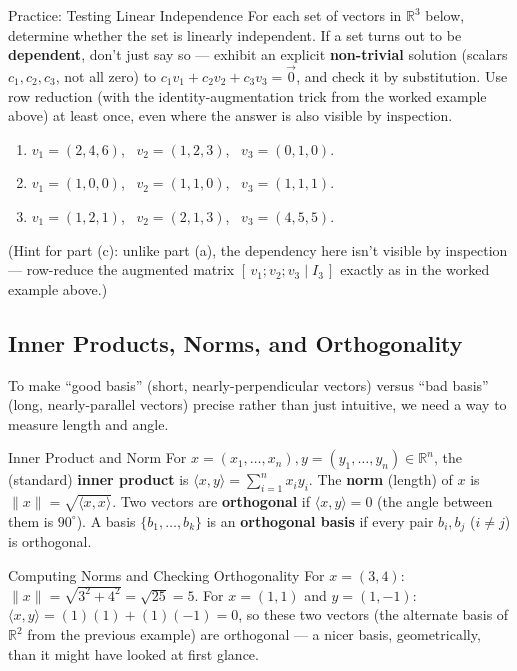 \begin{exercisebox}{Practice: Testing Linear Independence}
For each set of vectors in $\mathbb{R}^3$ below, determine whether the set is linearly independent. If a set turns out to be \textbf{dependent}, don't just say so --- exhibit an explicit \textbf{non-trivial} solution (scalars $c_1,c_2,c_3$, not all zero) to $c_1v_1+c_2v_2+c_3v_3=\vec 0$, and check it by substitution. Use row reduction (with the identity-augmentation trick from the worked example above) at least once, even where the answer is also visible by inspection.
\begin{enumerate}[leftmargin=*, label=(\alph*)]
  \item $v_1=(2,4,6)$, \ $v_2=(1,2,3)$, \ $v_3=(0,1,0)$.
  \item $v_1=(1,0,0)$, \ $v_2=(1,1,0)$, \ $v_3=(1,1,1)$.
  \item $v_1=(1,2,1)$, \ $v_2=(2,1,3)$, \ $v_3=(4,5,5)$.
\end{enumerate}
(Hint for part (c): unlike part (a), the dependency here isn't visible by inspection --- row-reduce the augmented matrix $[\,v_1;v_2;v_3\mid I_3\,]$ exactly as in the worked example above.)
\end{exercisebox}

\subsection{Inner Products, Norms, and Orthogonality}
\label{sec:L1:inner-products-norms-and-orthogonality}

To make ``good basis'' (short, nearly-perpendicular vectors) versus ``bad basis'' (long, nearly-parallel vectors) precise rather than just intuitive, we need a way to measure length and angle.

\begin{defbox}{Inner Product and Norm}
For $x = (x_1,\ldots,x_n), y=(y_1,\ldots,y_n) \in \mathbb{R}^n$, the (standard) \textbf{inner product} is $\langle x, y \rangle = \sum_{i=1}^n x_i y_i$. The \textbf{norm} (length) of $x$ is $\|x\| = \sqrt{\langle x,x \rangle}$. Two vectors are \textbf{orthogonal} if $\langle x,y \rangle = 0$ (the angle between them is $90^\circ$). A basis $\{b_1,\ldots,b_k\}$ is an \textbf{orthogonal basis} if every pair $b_i, b_j$ ($i \ne j$) is orthogonal.
\end{defbox}

\begin{exbox}{Computing Norms and Checking Orthogonality}
For $x=(3,4)$: $\|x\| = \sqrt{3^2+4^2} = \sqrt{25} = 5$. For $x=(1,1)$ and $y=(1,-1)$: $\langle x,y\rangle = (1)(1)+(1)(-1) = 0$, so these two vectors (the alternate basis of $\mathbb{R}^2$ from the previous example) are orthogonal --- a nicer basis, geometrically, than it might have looked at first glance.
\end{exbox}

